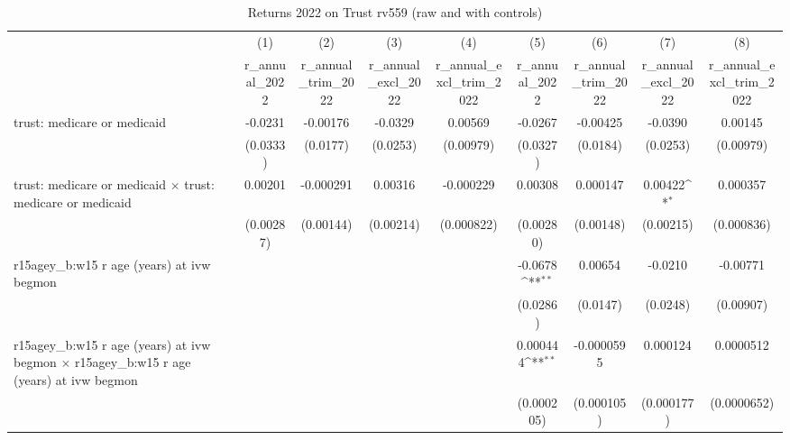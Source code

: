 \begin{table}[htbp]\centering
\def\sym#1{\ifmmode^{#1}\else\(^{#1}\)\fi}
\caption{Returns 2022 on Trust rv559 (raw and with controls)}
\begin{tabular}{l*{8}{c}}
\toprule
                &\multicolumn{1}{c}{(1)}&\multicolumn{1}{c}{(2)}&\multicolumn{1}{c}{(3)}&\multicolumn{1}{c}{(4)}&\multicolumn{1}{c}{(5)}&\multicolumn{1}{c}{(6)}&\multicolumn{1}{c}{(7)}&\multicolumn{1}{c}{(8)}\\
                &\multicolumn{1}{c}{r\_annual\_2022}&\multicolumn{1}{c}{r\_annual\_trim\_2022}&\multicolumn{1}{c}{r\_annual\_excl\_2022}&\multicolumn{1}{c}{r\_annual\_excl\_trim\_2022}&\multicolumn{1}{c}{r\_annual\_2022}&\multicolumn{1}{c}{r\_annual\_trim\_2022}&\multicolumn{1}{c}{r\_annual\_excl\_2022}&\multicolumn{1}{c}{r\_annual\_excl\_trim\_2022}\\
\midrule
trust: medicare or medicaid&  -0.0231         & -0.00176         &  -0.0329         &  0.00569         &  -0.0267         & -0.00425         &  -0.0390         &  0.00145         \\
                & (0.0333)         & (0.0177)         & (0.0253)         &(0.00979)         & (0.0327)         & (0.0184)         & (0.0253)         &(0.00979)         \\
\addlinespace
trust: medicare or medicaid $\times$ trust: medicare or medicaid&  0.00201         &-0.000291         &  0.00316         &-0.000229         &  0.00308         & 0.000147         &  0.00422\sym{*}  & 0.000357         \\
                &(0.00287)         &(0.00144)         &(0.00214)         &(0.000822)         &(0.00280)         &(0.00148)         &(0.00215)         &(0.000836)         \\
\addlinespace
r15agey\_b:w15 r age (years) at ivw begmon&                  &                  &                  &                  &  -0.0678\sym{**} &  0.00654         &  -0.0210         & -0.00771         \\
                &                  &                  &                  &                  & (0.0286)         & (0.0147)         & (0.0248)         &(0.00907)         \\
\addlinespace
r15agey\_b:w15 r age (years) at ivw begmon $\times$ r15agey\_b:w15 r age (years) at ivw begmon&                  &                  &                  &                  & 0.000444\sym{**} &-0.0000595         & 0.000124         &0.0000512         \\
                &                  &                  &                  &                  &(0.000205)         &(0.000105)         &(0.000177)         &(0.0000652)         \\

\end{tabular}
\end{table}
